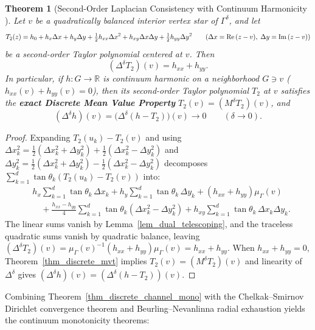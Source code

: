 \documentclass[11pt,reqno]{amsart}
\newtheorem{thm}{Theorem}[section]
\numberwithin{equation}{section}
\newcommand{\R}{\mathbb{R}}
\newcommand{\re}{\mbox{\rm Re\,}}
\newcommand{\im}{\mbox{\rm Im\,}}
\begin{document}
\begin{thm}[Second-Order Laplacian Consistency with Continuum Harmonicity {\cite[Lemma~2.2]{CS}}] \label{thm_taylor_consistency}
Let $v$ be a quadratically balanced interior vertex star of $\varGamma^{\delta}$, and let
\[
  T_2(z) = h_0 + h_x \Delta x + h_y \Delta y + \tfrac{1}{2} h_{xx} \Delta x^2 + h_{xy} \Delta x \Delta y + \tfrac{1}{2} h_{yy} \Delta y^2 \qquad (\Delta x = \re(z-v),\; \Delta y = \im(z-v))
\]
be a second-order Taylor polynomial centered at $v$. Then
\begin{equation} \label{eq_lap_taylor}
  (\Delta^{\delta} T_2)(v) = h_{xx} + h_{yy}.
\end{equation}
In particular, if $h : G \to \R$ is continuum harmonic on a neighborhood $G \ni v$ ($h_{xx}(v) + h_{yy}(v) = 0$), then its second-order Taylor polynomial $T_2$ at $v$ satisfies the \textbf{exact Discrete Mean Value Property} $T_2(v) = (M^{\delta} T_2)(v)$, and
\begin{equation} \label{eq_lap_remainder}
  (\Delta^{\delta} h)(v) = \bigl(\Delta^{\delta}(h - T_2)\bigr)(v) \longrightarrow 0 \qquad (\delta \to 0).
\end{equation}
\end{thm}
\begin{proof}
Expanding $T_2(u_k) - T_2(v)$ and using $\Delta x_k^2 = \frac{1}{2}(\Delta x_k^2 + \Delta y_k^2) + \frac{1}{2}(\Delta x_k^2 - \Delta y_k^2)$ and $\Delta y_k^2 = \frac{1}{2}(\Delta x_k^2 + \Delta y_k^2) - \frac{1}{2}(\Delta x_k^2 - \Delta y_k^2)$ decomposes $\sum_{k=1}^d \tan\theta_k(T_2(u_k) - T_2(v))$ into:
\begin{align*}
  &h_x \sum_{k=1}^d \tan\theta_k\,\Delta x_k + h_y \sum_{k=1}^d \tan\theta_k\,\Delta y_k + (h_{xx} + h_{yy})\mu_{\varGamma}(v) \\
  &\quad + \frac{h_{xx} - h_{yy}}{4}\sum_{k=1}^d \tan\theta_k(\Delta x_k^2 - \Delta y_k^2) + h_{xy}\sum_{k=1}^d \tan\theta_k\,\Delta x_k \Delta y_k.
\end{align*}
The linear sums vanish by Lemma~\ref{lem_dual_telescoping}, and the traceless quadratic sums vanish by quadratic balance, leaving $(\Delta^{\delta} T_2)(v) = \mu_{\varGamma}(v)^{-1}(h_{xx} + h_{yy})\mu_{\varGamma}(v) = h_{xx} + h_{yy}$. When $h_{xx} + h_{yy} = 0$, Theorem~\ref{thm_discrete_mvt} implies $T_2(v) = (M^{\delta} T_2)(v)$ and linearity of $\Delta^{\delta}$ gives $(\Delta^{\delta} h)(v) = (\Delta^{\delta}(h - T_2))(v)$.
\end{proof}

Combining Theorem~\ref{thm_discrete_channel_mono} with the Chelkak--Smirnov Dirichlet convergence theorem \cite[Theorem~3.12]{CS} and Beurling--Nevanlinna radial exhaustion yields the continuum monotonicity theorems:
\end{document}
